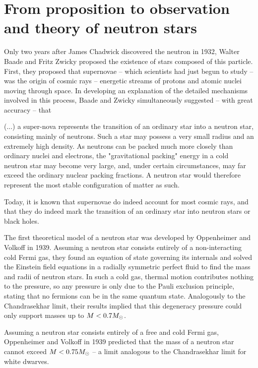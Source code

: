\section{From proposition to observation and theory of neutron stars}

Only two years after James Chadwick discovered the neutron in 1932, \cite{ref:neutron_discovery}
Walter Baade and Fritz Zwicky proposed the existence of stars composed of this particle. \cite{ref:supernova_cosmic_rays_neutron_stars}
First, they proposed that supernovae -- which scientists had just begun to study -- was the origin of cosmic rays -- energetic streams of protons and atomic nuclei moving through space.
In developing an explanation of the detailed mechanisms involved in this process, Baade and Zwicky simultaneously suggested -- with great accuracy -- that
\begin{displayquote}
(...) %
a super-nova represents the transition of an ordinary star into a neutron star, consisting mainly of neutrons.
Such a star may possess a very small radius and an extremely high density.
As neutrons can be packed much more closely than ordinary nuclei and electrons, the "gravitational packing" energy in a cold neutron star may become very large, and, under certain circumstances, may far exceed the ordinary nuclear packing fractions.
A neutron star would therefore represent the most stable configuration of matter as such.
\cite[page 263]{ref:supernova_cosmic_rays_neutron_stars}
\end{displayquote}
Today, it is known that supernovae do indeed account for most cosmic rays, and that they do indeed mark the transition of an ordinary star into neutron stars or black holes.

The first theoretical model of a neutron star was developed by Oppenheimer and Volkoff in 1939. \cite{ref:tov}
Assuming a neutron star consists entirely of a non-interacting cold Fermi gas, they found an equation of state governing its internals and solved the Einstein field equations in a radially symmetric perfect fluid to find the mass and radii of neutron stars.
In such a cold gas, thermal motion contributes nothing to the pressure, so any pressure is only due to the Pauli exclusion principle, stating that no fermions can be in the same quantum state.
Analogously to the Chandrasekhar limit, their results implied that this degeneracy pressure could only support masses up to $M < 0.7 M_\odot$.

Assuming a neutron star consists entirely of a free and cold Fermi gas, Oppenheimer and Volkoff in 1939 predicted  that the mass of a neutron star cannot exceed $M < 0.75 M_\odot$ \cite{ref:tov} -- a limit analogous to the Chandrasekhar limit for white dwarves.


